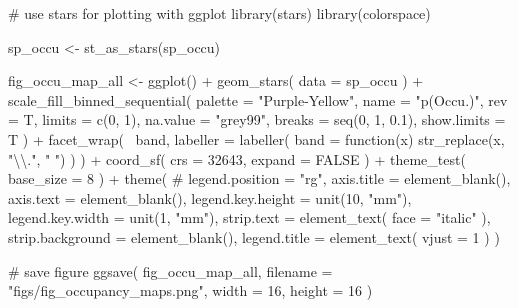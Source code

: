\documentclass[
]{article}
\newenvironment{Shaded}{}{}
\newcommand{\CharTok}[1]{\textcolor[rgb]{0.00,0.50,0.50}{#1}}
\newcommand{\CommentTok}[1]{\textcolor[rgb]{0.00,0.50,0.00}{#1}}
\newcommand{\ControlFlowTok}[1]{\textcolor[rgb]{0.00,0.00,1.00}{#1}}
\newcommand{\DataTypeTok}[1]{#1}
\newcommand{\DecValTok}[1]{#1}
\newcommand{\FloatTok}[1]{#1}
\newcommand{\KeywordTok}[1]{\textcolor[rgb]{0.00,0.00,1.00}{#1}}
\newcommand{\NormalTok}[1]{#1}
\newcommand{\OperatorTok}[1]{#1}
\newcommand{\OtherTok}[1]{\textcolor[rgb]{1.00,0.25,0.00}{#1}}
\newcommand{\StringTok}[1]{\textcolor[rgb]{0.00,0.50,0.50}{#1}}
\begin{document}
\begin{Shaded}
\begin{Highlighting}[]
\CommentTok{# use stars for plotting with ggplot}
\KeywordTok{library}\NormalTok{(stars)}
\KeywordTok{library}\NormalTok{(colorspace)}

\NormalTok{sp_occu <-}\StringTok{ }\KeywordTok{st_as_stars}\NormalTok{(sp_occu)}

\NormalTok{fig_occu_map_all <-}
\StringTok{  }\KeywordTok{ggplot}\NormalTok{() }\OperatorTok{+}
\StringTok{  }\KeywordTok{geom_stars}\NormalTok{(}
    \DataTypeTok{data =}\NormalTok{ sp_occu}
\NormalTok{  ) }\OperatorTok{+}
\StringTok{  }\KeywordTok{scale_fill_binned_sequential}\NormalTok{(}
    \DataTypeTok{palette =} \StringTok{"Purple-Yellow"}\NormalTok{,}
    \DataTypeTok{name =} \StringTok{"p(Occu.)"}\NormalTok{,}
    \DataTypeTok{rev =}\NormalTok{ T,}
    \DataTypeTok{limits =} \KeywordTok{c}\NormalTok{(}\DecValTok{0}\NormalTok{, }\DecValTok{1}\NormalTok{),}
    \DataTypeTok{na.value =} \StringTok{"grey99"}\NormalTok{,}
    \DataTypeTok{breaks =} \KeywordTok{seq}\NormalTok{(}\DecValTok{0}\NormalTok{, }\DecValTok{1}\NormalTok{, }\FloatTok{0.1}\NormalTok{), }\DataTypeTok{show.limits =}\NormalTok{ T}
\NormalTok{  ) }\OperatorTok{+}
\StringTok{  }\KeywordTok{facet_wrap}\NormalTok{(}
    \OperatorTok{~}\NormalTok{band,}
    \DataTypeTok{labeller =} \KeywordTok{labeller}\NormalTok{(}
      \DataTypeTok{band =} \ControlFlowTok{function}\NormalTok{(x) }\KeywordTok{str_replace}\NormalTok{(x, }\StringTok{"}\CharTok{\textbackslash{}\textbackslash{}}\StringTok{."}\NormalTok{, }\StringTok{" "}\NormalTok{)}
\NormalTok{    )}
\NormalTok{  ) }\OperatorTok{+}
\StringTok{  }\KeywordTok{coord_sf}\NormalTok{(}
    \DataTypeTok{crs =} \DecValTok{32643}\NormalTok{,}
    \DataTypeTok{expand =} \OtherTok{FALSE}
\NormalTok{  ) }\OperatorTok{+}
\StringTok{  }\KeywordTok{theme_test}\NormalTok{(}
    \DataTypeTok{base_size =} \DecValTok{8}
\NormalTok{  ) }\OperatorTok{+}
\StringTok{  }\KeywordTok{theme}\NormalTok{(}
    \CommentTok{# legend.position = "rg",}
    \DataTypeTok{axis.title =} \KeywordTok{element_blank}\NormalTok{(),}
    \DataTypeTok{axis.text =} \KeywordTok{element_blank}\NormalTok{(),}
    \DataTypeTok{legend.key.height =} \KeywordTok{unit}\NormalTok{(}\DecValTok{10}\NormalTok{, }\StringTok{"mm"}\NormalTok{),}
    \DataTypeTok{legend.key.width =} \KeywordTok{unit}\NormalTok{(}\DecValTok{1}\NormalTok{, }\StringTok{"mm"}\NormalTok{),}
    \DataTypeTok{strip.text =} \KeywordTok{element_text}\NormalTok{(}
      \DataTypeTok{face =} \StringTok{"italic"}
\NormalTok{    ),}
    \DataTypeTok{strip.background =} \KeywordTok{element_blank}\NormalTok{(),}
    \DataTypeTok{legend.title =} \KeywordTok{element_text}\NormalTok{(}
      \DataTypeTok{vjust =} \DecValTok{1}
\NormalTok{    )}
\NormalTok{  )}

\CommentTok{# save figure}
\KeywordTok{ggsave}\NormalTok{(}
\NormalTok{  fig_occu_map_all,}
  \DataTypeTok{filename =} \StringTok{"figs/fig_occupancy_maps.png"}\NormalTok{,}
  \DataTypeTok{width =} \DecValTok{16}\NormalTok{, }\DataTypeTok{height =} \DecValTok{16}
\NormalTok{)}
\end{Highlighting}
\end{Shaded}
\end{document}
